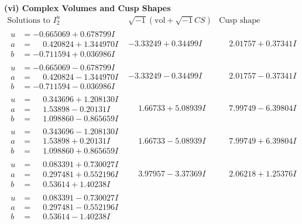 \documentclass[1p]{elsarticle_modified}
\theoremstyle{definition}
\newcommand{\I}{\sqrt{-1}}
\begin{document}
\newpage\flushleft \textbf{(vi) Complex Volumes and Cusp Shapes}
$$\begin{array}{c|c|c}  
\text{Solutions to }I^u_{2}& \I (\text{vol} + \sqrt{-1}CS) & \text{Cusp shape}\\
 \hline 
\begin{aligned}
u &= -0.665069 + 0.678799 I \\
a &= \phantom{-}0.420824 + 1.344970 I \\
b &= -0.711594 + 0.036986 I\end{aligned}
 & -3.33249 + 0.34499 I & \phantom{-}2.01757 + 0.37341 I \\ \hline\begin{aligned}
u &= -0.665069 - 0.678799 I \\
a &= \phantom{-}0.420824 - 1.344970 I \\
b &= -0.711594 - 0.036986 I\end{aligned}
 & -3.33249 - 0.34499 I & \phantom{-}2.01757 - 0.37341 I \\ \hline\begin{aligned}
u &= \phantom{-}0.343696 + 1.208130 I \\
a &= \phantom{-}1.53898 - 0.20131 I \\
b &= \phantom{-}1.098860 - 0.865659 I\end{aligned}
 & \phantom{-}1.66733 + 5.08939 I & \phantom{-}7.99749 - 6.39804 I \\ \hline\begin{aligned}
u &= \phantom{-}0.343696 - 1.208130 I \\
a &= \phantom{-}1.53898 + 0.20131 I \\
b &= \phantom{-}1.098860 + 0.865659 I\end{aligned}
 & \phantom{-}1.66733 - 5.08939 I & \phantom{-}7.99749 + 6.39804 I \\ \hline\begin{aligned}
u &= \phantom{-}0.083391 + 0.730027 I \\
a &= \phantom{-}0.297481 + 0.552196 I \\
b &= \phantom{-}0.53614 + 1.40238 I\end{aligned}
 & \phantom{-}3.97957 - 3.37369 I & \phantom{-}2.06218 + 1.25376 I \\ \hline\begin{aligned}
u &= \phantom{-}0.083391 - 0.730027 I \\
a &= \phantom{-}0.297481 - 0.552196 I \\
b &= \phantom{-}0.53614 - 1.40238 I\end{aligned}

\end{array}$$
\end{document}
